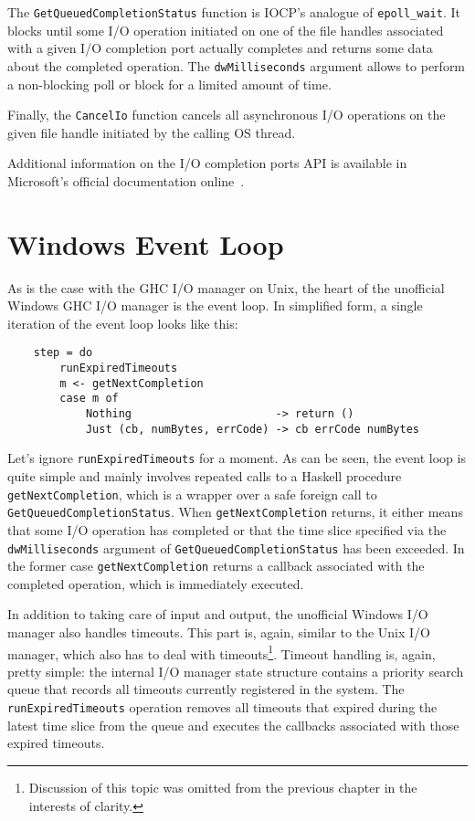 \documentclass[a4paper,11pt,oneside]{report}
\begin{document}
The \texttt{GetQueuedCompletionStatus} function is IOCP's analogue of
\texttt{epoll\_wait}. It blocks until some I/O operation initiated on one of the
file handles associated with a given I/O completion port actually completes
and returns some data about the completed operation. The \texttt{dwMilliseconds}
argument allows to perform a non-blocking poll or block for a limited amount of
time.

Finally, the \texttt{CancelIo} function cancels all asynchronous I/O operations
on the given file handle initiated by the calling OS thread.

Additional information on the I/O completion ports API is available in
Microsoft's official documentation online~\cite{bib:msdn}.

\section{Windows Event Loop}

As is the case with the GHC I/O manager on Unix, the heart of the unofficial
Windows GHC I/O manager is the event loop. In simplified form, a single
iteration of the event loop looks like this:

\begin{verbatim}
    step = do
        runExpiredTimeouts
        m <- getNextCompletion
        case m of
            Nothing                      -> return ()
            Just (cb, numBytes, errCode) -> cb errCode numBytes
\end{verbatim}

Let's ignore \texttt{runExpiredTimeouts} for a moment. As can be seen, the event
loop is quite simple and mainly involves repeated calls to a Haskell procedure
\texttt{getNextCompletion}, which is a wrapper over a safe foreign call to
\texttt{GetQueuedCompletionStatus}. When \texttt{getNextCompletion} returns, it
either means that some I/O operation has completed or that the time slice
specified via the \texttt{dwMilliseconds} argument of
\texttt{GetQueuedCompletionStatus} has been exceeded. In the former case
\texttt{getNextCompletion} returns a callback associated with the completed
operation, which is immediately executed.

In addition to taking care of input and output, the unofficial Windows I/O
manager also handles timeouts. This part is, again, similar to the Unix I/O
manager, which also has to deal with timeouts\footnote{Discussion of this topic
  was omitted from the previous chapter in the interests of clarity.}. Timeout
handling is, again, pretty simple: the internal I/O manager state structure
contains a priority search queue that records all timeouts currently registered
in the system. The \texttt{runExpiredTimeouts} operation removes all timeouts
that expired during the latest time slice from the queue and executes the
callbacks associated with those expired timeouts.
\end{document}
